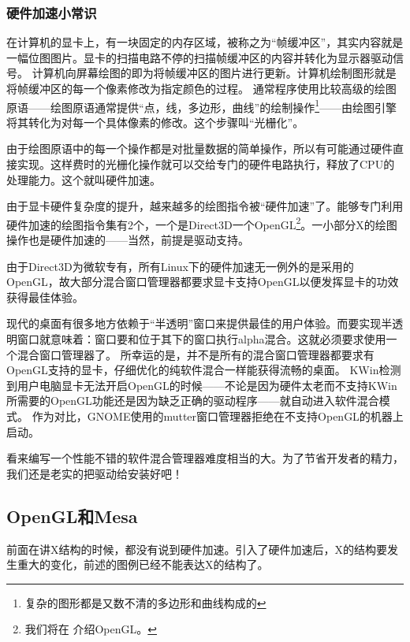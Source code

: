 \begin{insertnote}
\subsubsection{硬件加速小常识}
在计算机的显卡上，有一块固定的内存区域，被称之为“帧缓冲区”，其实内容就是一幅位图图片。显卡的扫描电路不停的扫描帧缓冲区的内容并转化为显示器驱动信号。
计算机向屏幕绘图的即为将帧缓冲区的图片进行更新。计算机绘制图形就是将帧缓冲区的每一个像素修改为指定颜色的过程。
通常程序使用比较高级的绘图原语——绘图原语通常提供“点，线，多边形，曲线”的绘制操作\footnote{复杂的图形都是又数不清的多边形和曲线构成的}——由绘图引擎将其转化为对每一个具体像素的修改。这个步骤叫“光栅化”。

由于绘图原语中的每一个操作都是对批量数据的简单操作，所以有可能通过硬件直接实现。这样费时的光栅化操作就可以交给专门的硬件电路执行，释放了CPU的处理能力。这个就叫硬件加速。

由于显卡硬件复杂度的提升，越来越多的绘图指令被“硬件加速”了。能够专门利用硬件加速的绘图指令集有2个，一个是Direct3D一个OpenGL\footnote{我们将在  介绍OpenGL。}。一小部分X的绘图操作也是硬件加速的——当然，前提是驱动支持。

由于Direct3D为微软专有，所有Linux下的硬件加速无一例外的是采用的OpenGL，故大部分混合窗口管理器都要求显卡支持OpenGL以便发挥显卡的功效获得最佳体验。

\end{insertnote}

现代的桌面有很多地方依赖于“半透明”窗口来提供最佳的用户体验。而要实现半透明窗口就意味着：窗口要和位于其下的窗口执行alpha混合。这就必须要求使用一个混合窗口管理器了。
所幸运的是，并不是所有的混合窗口管理器都要求有OpenGL支持的显卡，仔细优化的纯软件混合一样能获得流畅的桌面。
KWin检测到用户电脑显卡无法开启OpenGL的时候——不论是因为硬件太老而不支持KWin所需要的OpenGL功能还是因为缺乏正确的驱动程序——就自动进入软件混合模式。
作为对比，GNOME使用的mutter窗口管理器拒绝在不支持OpenGL的机器上启动。

看来编写一个性能不错的软件混合管理器难度相当的大。为了节省开发者的精力，我们还是老实的把驱动给安装好吧！

\subsection{OpenGL和Mesa}\label{sec:OpenGL}

前面在讲X结构的时候，都没有说到硬件加速。引入了硬件加速后，X的结构要发生重大的变化，前述的图例已经不能表达X的结构了。

